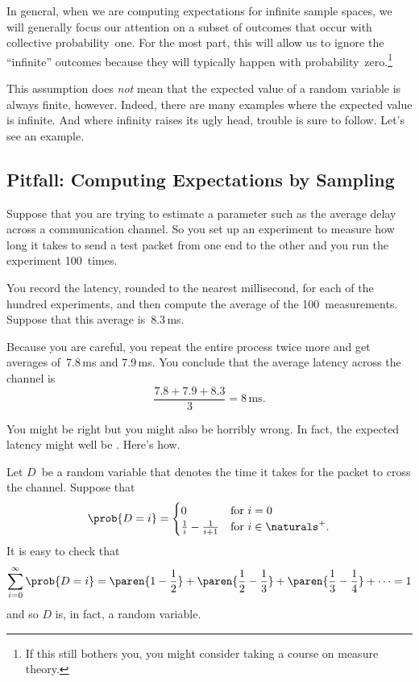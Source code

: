 In general, when we are computing expectations for infinite sample
spaces, we will generally focus our attention on a subset of outcomes
that occur with collective probability~one.  For the most part, this
will allow us to ignore the ``infinite'' outcomes because they will
typically happen with probability~zero.\footnote{If this still bothers
  you, you might consider taking a course on measure theory.}

This assumption does \emph{not} mean that the expected value of a
random variable is always finite, however.  Indeed, there are many
examples where the expected value is infinite.  And where infinity
raises its ugly head, trouble is sure to follow.  Let's see an
example.

\subsection{Pitfall: Computing Expectations by Sampling}
\label{sec:latency}

Suppose that you are trying to estimate a parameter such as the
average delay across a communication channel.  So you set up an
experiment to measure how long it takes to send a test packet from one
end to the other and you run the experiment 100~times.

You record the latency, rounded to the nearest millisecond, for each
of the hundred experiments, and then compute the average of the
100~measurements.  Suppose that this average is~8.3\,ms.

Because you are careful, you repeat the entire process twice more and
get averages of~7.8\,ms and 7.9\,ms.  You conclude that the average
latency across the channel is
\begin{equation*}
    \frac{7.8 + 7.9 + 8.3}{3} = 8\,\mathrm{ms}.
\end{equation*}

You might be right but you might also be horribly wrong.  In fact, the
expected latency might well be .  Here's how.

Let $D$~be a random variable that denotes the time it takes for the
packet to cross the channel.  Suppose that 
\begin{equation}\label{eqn:17T1}
\prob{D = i} = \begin{cases}
                0 & \text{for $i = 0$} \\
                \frac{1}{i} - \frac{1}{i + 1}   & \text{for $i \in \naturals^+$}.
               \end{cases}
\end{equation}
It is easy to check that
\begin{align*}
\sum_{i = 0}^\infty \prob{D = i}
    = \paren{1 - \frac{1}{2}} + \paren{\frac{1}{2} - \frac{1}{3}}
        + \paren{\frac{1}{3} - \frac{1}{4}} + \cdots %
    = 1
\end{align*}
and so $D$ is, in fact, a random variable.

